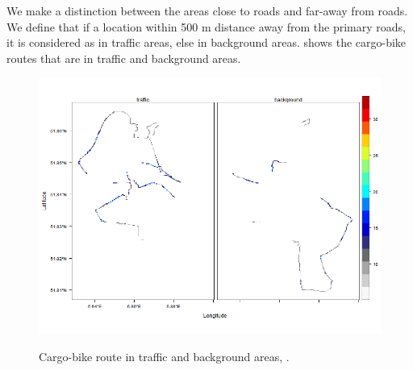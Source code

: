 \documentclass{article}
\begin{document}
We make a distinction between the areas close to roads and far-away from roads. We define that if a location within 500 m distance away from the primary roads, it is considered as in traffic areas, else in background areas.  shows the cargo-bike routes that are in traffic and background areas.  
\begin{figure}[H]
    \includegraphics[width=\linewidth,trim=1cm 2cm 1cm 1cm, clip=true]{f2.png}
    \label{seperate}
    \caption {Cargo-bike route in traffic and background areas, .}
\end{figure}
\end{document}
